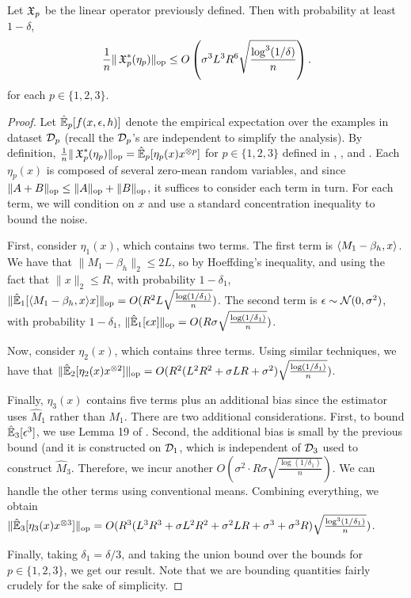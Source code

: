 \begin{lemma}
\label{lem:lowRankUpper}
Let $\operatorname{\mathfrak{X}}_p$ be the linear operator previously defined. Then with
probability at least $1-\delta$,
$$\frac1{n} \|\operatorname{\mathfrak{X}}_p^*(\eta_p)\|_{\text{\rm op}} \le O\left(\sigma^3 L^3 R^6 \sqrt{\frac{\log^3(1/\delta)}{n}}\right).$$
for each $p \in \{1,2,3\}$.
\end{lemma}
\begin{proof}
Let $\hat{\operatorname{\mathbb{E}}}_p[f(x,\epsilon,h)]$ denote the empirical expectation over
the examples in dataset $\mathcal{D}_p$ (recall the $\mathcal{D}_p$'s are independent to
simplify the analysis).  By definition,
$\frac1n \|\operatorname{\mathfrak{X}}_p^*(\eta_p)\|_{\text{\rm op}} = \hat{\operatorname{\mathbb{E}}}_p[\eta_p(x) x^{\otimes p}]$
for $p \in \{1,2,3\}$ defined in , , and
. Each $\eta_p(x)$ is composed of several zero-mean random
variables, and since $\|A + B\|_{\text{\rm op}} \le \|A\|_{\text{\rm op}} + \|B\|_{\text{\rm op}}$, it
suffices to consider each term in turn. For each term, we will
condition on $x$ and use a standard concentration inequality to bound
the noise.


First, consider $\eta_1(x)$, which contains two terms.
The first term is $\langle M_1 - \beta_h, x \rangle$.
We have that $\|M_1 - \beta_h\|_2 \le 2L$,
so by Hoeffding's inequality, and using the fact that $\|x\|_2 \le R$,
with probability $1-\delta_1$,
$\|\hat{\operatorname{\mathbb{E}}}_1[\langle M_1 - \beta_h, x \rangle x]\|_{\text{\rm op}} = O(R^2 L \sqrt{\frac{\log(1/\delta_1)}{n}})$.
The second term is $\epsilon \sim \mathcal{N}(0, \sigma^2)$,
with probability $1-\delta_1$,
$\|\hat{\operatorname{\mathbb{E}}}_1[\epsilon x]\|_{\text{\rm op}} = O(R \sigma \sqrt{\frac{\log(1/\delta_1)}{n}})$.

Now, consider $\eta_2(x)$, which contains three terms.
Using similar techniques, we have that
$\|\hat{\operatorname{\mathbb{E}}}_2[\eta_2(x) x^{\otimes 2}]\|_{\text{\rm op}} = O(R^2 (L^2 R^2 + \sigma L R + \sigma^2) \sqrt{\frac{\log(1/\delta_1)}{n}})$.

Finally, $\eta_3(x)$ contains five terms plus an additional bias since the estimator uses $\hat M_1$ rather than $M_1$.
There are two additional considerations.
First, to bound $\hat{\operatorname{\mathbb{E}}}_3[\epsilon^3]$, we use Lemma 19 of \cite{hsu13spherical}.
Second, the additional bias is small by the previous bound (and it is constructed on $\mathcal{D}_1$, which is independent of $\mathcal{D}_3$
used to construct $\hat M_3$.
Therefore, we incur another $O(\sigma^2 \cdot R \sigma \sqrt{\frac{\log(1/\delta_1)}{n}})$.
We can handle the other terms using conventional means.
Combining everything, we obtain
$\|\hat{\operatorname{\mathbb{E}}}_3[\eta_3(x) x^{\otimes 3}]\|_{\text{\rm op}} = O(R^3 (L^3 R^3 + \sigma L^2 R^2 + \sigma^2 L R + \sigma^3 + \sigma^3 R) \sqrt{\frac{\log^3(1/\delta_1)}{n}})$.

Finally, taking $\delta_1 = \delta/3$, and taking the union bound over the bounds for $p \in \{1,2,3\}$,
we get our result.
Note that we are bounding quantities fairly crudely for the sake of simplicity.
\end{proof}

